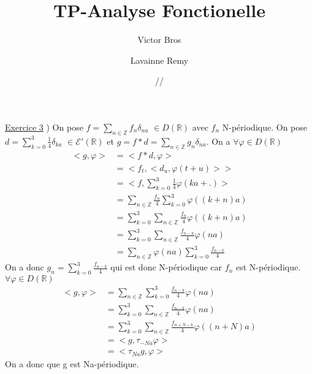 \documentclass[a4paper,11pt]{article}
\title{\textbf{TP-Analyse Fonctionelle}}
\author{Victor Bros \and Lavainne Remy}
\date{\oldstylenums{07}/\oldstylenums{11}/\oldstylenums{2018}}
\begin{document}
\maketitle
\underline{Exercice 3}
) On pose $\displaystyle f= \sum_{n \in \mathbb{Z}} f_n \delta_{na} \,\, \in D(\mathbb{R})$ avec $f_n$ N-périodique.
On pose $\displaystyle d = \sum_{k=0}^{3} \frac{1}{4}\delta_{ka} \,\, \in \mathcal{E}'(\mathbb{R})$ et
$\displaystyle g = f \ast d = \sum_{n \in \mathbb{Z}} g_n \delta_{na}$.
\newline
On a $\displaystyle \forall \varphi \in D(\mathbb{R})$ 
\begin{equation}
    \begin{aligned}
        <g,\varphi> &= <f\ast d, \varphi> \\
                    &= <f_{t},<d_{u},\varphi(t+u)>>\\
                    &= <f, \displaystyle{\sum_{k=0}^3 \frac{1}{4} \varphi(ka+.)}>\\
                    &= \displaystyle{\sum_{n \in \mathbb{Z}} \frac{f_n}{4} \sum_{k=0}^{3} \varphi((k+n)a)}\\
                    &=\displaystyle{\sum_{k=0}^{3} \sum_{n \in \mathbb{Z}} \frac{f_n}{4} \varphi((k+n)a)}\\
                    &=\displaystyle{\sum_{k=0}^{3} \sum_{n \in \mathbb{Z}} \frac{f_{n-k}}{4} \varphi(na)}\\
                    &=\displaystyle{\sum_{n \in \mathbb{Z}} \varphi(na) \sum_{k=0}^{3} \frac{f_{n-k}}{4}}
    \end{aligned}
\end{equation}
On a donc $\displaystyle g_n = \sum_{k=0}^{3} \frac{f_{n-k}}{4}$ qui est donc N-périodique car $f_n$ est N-périodique.
\newline
$\forall \varphi \in D(\mathbb{R})$
\begin{equation}
    \begin{aligned}
        <g,\varphi> &= \displaystyle{\sum_{n \in \mathbb{Z}} \sum_{k=0}^{3} \frac{f_{n-k}}{4} \varphi(na)}\\
                    &= \displaystyle{\sum_{k=0}^{3} \sum_{n \in \mathbb{Z}} \frac{f_{n-k}}{4} \varphi(na)}\\
                    &= \displaystyle{\sum_{k=0}^{3} \sum_{n \in \mathbb{Z}} \frac{f_{n+N-k}}{4} \varphi((n+N)a)}\\
                    &= <g, \tau_{-Na}\varphi>\\
                    &= <\tau_{Na}g,\varphi>
    \end{aligned}
\end{equation}
On a donc que g est Na-périodique.
\end{document}
